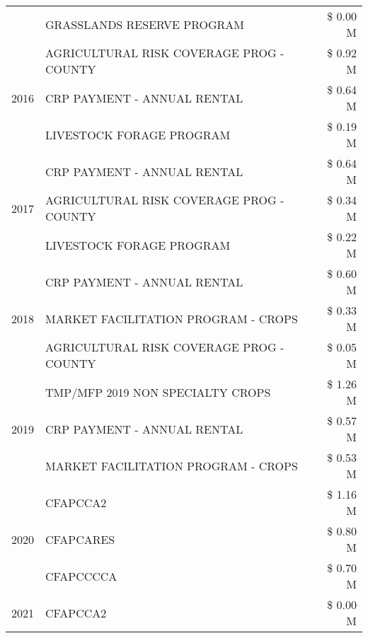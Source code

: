 \begin{tabular}{llr}
 & GRASSLANDS RESERVE PROGRAM & \$ 0.00 M \\
\cline{1-3}
\multirow[t]{3}{*}{2016} & AGRICULTURAL RISK COVERAGE PROG - COUNTY & \$ 0.92 M \\
 & CRP PAYMENT - ANNUAL RENTAL & \$ 0.64 M \\
 & LIVESTOCK FORAGE PROGRAM & \$ 0.19 M \\
\cline{1-3}
\multirow[t]{3}{*}{2017} & CRP PAYMENT - ANNUAL RENTAL & \$ 0.64 M \\
 & AGRICULTURAL RISK COVERAGE PROG - COUNTY & \$ 0.34 M \\
 & LIVESTOCK FORAGE PROGRAM & \$ 0.22 M \\
\cline{1-3}
\multirow[t]{3}{*}{2018} & CRP PAYMENT - ANNUAL RENTAL & \$ 0.60 M \\
 & MARKET FACILITATION PROGRAM - CROPS & \$ 0.33 M \\
 & AGRICULTURAL RISK COVERAGE PROG - COUNTY & \$ 0.05 M \\
\cline{1-3}
\multirow[t]{3}{*}{2019} & TMP/MFP 2019 NON SPECIALTY CROPS & \$ 1.26 M \\
 & CRP PAYMENT - ANNUAL RENTAL & \$ 0.57 M \\
 & MARKET FACILITATION PROGRAM - CROPS & \$ 0.53 M \\
\cline{1-3}
\multirow[t]{3}{*}{2020} & CFAPCCA2 & \$ 1.16 M \\
 & CFAPCARES & \$ 0.80 M \\
 & CFAPCCCCA & \$ 0.70 M \\
\cline{1-3}
2021 & CFAPCCA2 & \$ 0.00 M \\
\cline{1-3}
\bottomrule
\end{tabular}
